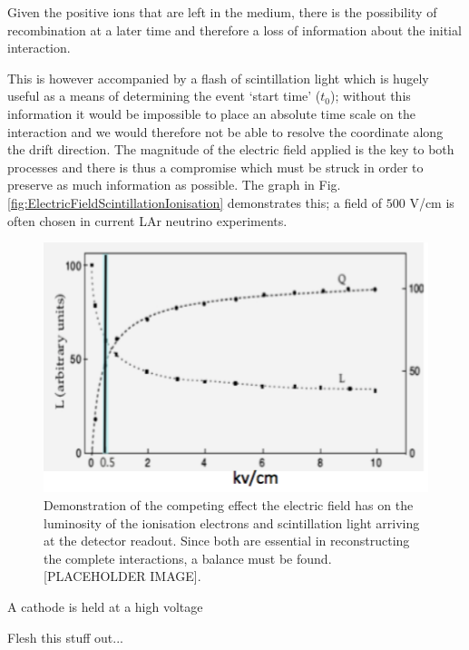 Given the positive ions that are left in the medium, there is the possibility of recombination at a later time and therefore a loss of information about the initial interaction.


This is however accompanied by a flash of scintillation light which is hugely useful as a means of determining the event `start time' ($t_0$); without this information it would be impossible to place an absolute time scale on the interaction and we would therefore not be able to resolve the coordinate along the drift direction.  The magnitude of the electric field applied is the key to both processes and there is thus a compromise which must be struck in order to preserve as much information as possible.  The graph in Fig. \ref{fig:ElectricFieldScintillationIonisation} demonstrates this; a field of $500$ V/cm is often chosen in current LAr neutrino experiments.

\begin{figure}[ht]
  \centering
  \includegraphics[width=12cm]{ElectricFieldScintillationIonisation.png}
  \caption[Affect of electric field on luminosity of ionisation electrons and scintillation light in a LArTPC]{Demonstration of the competing effect the electric field has on the luminosity of the ionisation electrons and scintillation light arriving at the detector readout.  Since both are essential in reconstructing the complete interactions, a balance must be found. [PLACEHOLDER IMAGE].}
  \label{fig:ElectronFieldScintiallationIonisation}
\end{figure}

A cathode is held at a high voltage



Flesh this stuff out...


